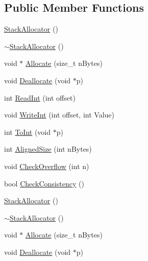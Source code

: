 \subsection*{Public Member Functions}
\begin{DoxyCompactItemize}
\item 
\mbox{\hyperlink{classROOT_1_1Minuit2_1_1StackAllocator_a4fe80b380d5a1d1a58bb916d9aa47e29}{Stack\+Allocator}} ()
\item 
\mbox{\hyperlink{classROOT_1_1Minuit2_1_1StackAllocator_ac1f5e9946a42290da68e86edf84cc528}{$\sim$\+Stack\+Allocator}} ()
\item 
void $\ast$ \mbox{\hyperlink{classROOT_1_1Minuit2_1_1StackAllocator_a1fb4d1744055446776080af229679e03}{Allocate}} (size\+\_\+t n\+Bytes)
\item 
void \mbox{\hyperlink{classROOT_1_1Minuit2_1_1StackAllocator_ac36426e01e1474491cef1b203dba2f0c}{Deallocate}} (void $\ast$p)
\item 
int \mbox{\hyperlink{classROOT_1_1Minuit2_1_1StackAllocator_a811df825be4e6f67dc5a9139eb2edfdd}{Read\+Int}} (int offset)
\item 
void \mbox{\hyperlink{classROOT_1_1Minuit2_1_1StackAllocator_a1f87ef34658b74aa3fff9abd1cd1094e}{Write\+Int}} (int offset, int Value)
\item 
int \mbox{\hyperlink{classROOT_1_1Minuit2_1_1StackAllocator_a8c8afb9902a08eec0ec7c863636694e5}{To\+Int}} (void $\ast$p)
\item 
int \mbox{\hyperlink{classROOT_1_1Minuit2_1_1StackAllocator_ab40fb208cf8d4c0b3edf51137672c3d1}{Aligned\+Size}} (int n\+Bytes)
\item 
void \mbox{\hyperlink{classROOT_1_1Minuit2_1_1StackAllocator_a96a7565f7b4bb269f740901eef54a97e}{Check\+Overflow}} (int n)
\item 
bool \mbox{\hyperlink{classROOT_1_1Minuit2_1_1StackAllocator_ad1189cdc76a07c36ef1924ad2488797d}{Check\+Consistency}} ()
\item 
\mbox{\hyperlink{classROOT_1_1Minuit2_1_1StackAllocator_a4fe80b380d5a1d1a58bb916d9aa47e29}{Stack\+Allocator}} ()
\item 
\mbox{\hyperlink{classROOT_1_1Minuit2_1_1StackAllocator_ac1f5e9946a42290da68e86edf84cc528}{$\sim$\+Stack\+Allocator}} ()
\item 
void $\ast$ \mbox{\hyperlink{classROOT_1_1Minuit2_1_1StackAllocator_a1fb4d1744055446776080af229679e03}{Allocate}} (size\+\_\+t n\+Bytes)
\item 
void \mbox{\hyperlink{classROOT_1_1Minuit2_1_1StackAllocator_ac36426e01e1474491cef1b203dba2f0c}{Deallocate}} (void $\ast$p)

\end{DoxyCompactItemize}
